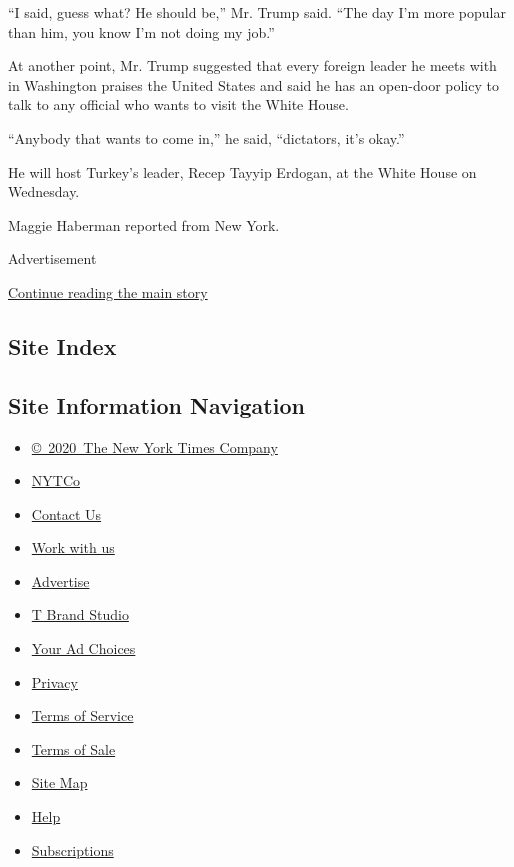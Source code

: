 ``I said, guess what? He should be,'' Mr. Trump said. ``The day I'm more
popular than him, you know I'm not doing my job.''

At another point, Mr. Trump suggested that every foreign leader he meets
with in Washington praises the United States and said he has an
open-door policy to talk to any official who wants to visit the White
House.

``Anybody that wants to come in,'' he said, ``dictators, it's okay.''

He will host Turkey's leader, Recep Tayyip Erdogan, at the White House
on Wednesday.

Maggie Haberman reported from New York.

Advertisement

\protect\hyperlink{after-bottom}{Continue reading the main story}

\hypertarget{site-index}{%
\subsection{Site Index}\label{site-index}}

\hypertarget{site-information-navigation}{%
\subsection{Site Information
Navigation}\label{site-information-navigation}}

\begin{itemize}
\tightlist
\item
  \href{https://help.nytimes.com/hc/en-us/articles/115014792127-Copyright-notice}{©~2020~The
  New York Times Company}
\end{itemize}

\begin{itemize}
\tightlist
\item
  \href{https://www.nytco.com/}{NYTCo}
\item
  \href{https://help.nytimes.com/hc/en-us/articles/115015385887-Contact-Us}{Contact
  Us}
\item
  \href{https://www.nytco.com/careers/}{Work with us}
\item
  \href{https://nytmediakit.com/}{Advertise}
\item
  \href{http://www.tbrandstudio.com/}{T Brand Studio}
\item
  \href{https://www.nytimes.com/privacy/cookie-policy\#how-do-i-manage-trackers}{Your
  Ad Choices}
\item
  \href{https://www.nytimes.com/privacy}{Privacy}
\item
  \href{https://help.nytimes.com/hc/en-us/articles/115014893428-Terms-of-service}{Terms
  of Service}
\item
  \href{https://help.nytimes.com/hc/en-us/articles/115014893968-Terms-of-sale}{Terms
  of Sale}
\item
  \href{https://spiderbites.nytimes.com}{Site Map}
\item
  \href{https://help.nytimes.com/hc/en-us}{Help}
\item
  \href{https://www.nytimes.com/subscription?campaignId=37WXW}{Subscriptions}
\end{itemize}
